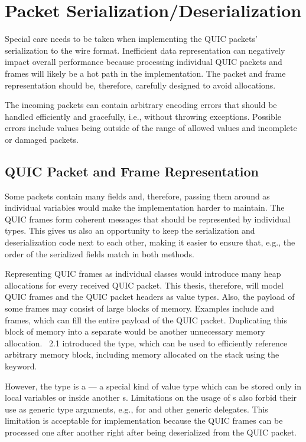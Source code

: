 \section{Packet Serialization/Deserialization}

Special care needs to be taken when implementing the QUIC packets' serialization to the wire format.
Inefficient data representation can negatively impact overall performance because processing
individual QUIC packets and frames will likely be a hot path in the implementation. The packet and
frame representation should be, therefore, carefully designed to avoid allocations.

The incoming packets can contain arbitrary encoding errors that should be handled efficiently and
gracefully, i.e., without throwing exceptions. Possible errors include values being outside of the
range of allowed values and incomplete or damaged packets.

\subsection{QUIC Packet and Frame Representation}\label{sec:03-data-representation}

Some packets contain many fields and, therefore, passing them around as individual variables would
make the implementation harder to maintain. The QUIC frames form coherent messages that should be
represented by individual \dotnet{} types. This gives us also an opportunity to keep the
serialization and deserialization code next to each other, making it easier to ensure that, e.g.,
the order of the serialized fields match in both methods.

Representing QUIC frames as individual classes would introduce many heap allocations for every
received QUIC packet. This thesis, therefore, will model QUIC frames and the QUIC packet headers as
value types. Also, the payload of some frames may consist of large blocks of memory. Examples
include \STREAM{} and \CRYPTO{} frames, which can fill the entire payload of the QUIC packet.
Duplicating this block of memory into a separate \ArrayOf{\Byte{}} would be another unnecessary memory
allocation. \dotnet{}~2.1 introduced the  type, which can be used to efficiently
reference arbitrary memory block, including memory allocated on the stack using the
 keyword.

However, the  type is a  --- a special kind of value type which
can be stored only in local variables or inside another s. Limitations on the
usage of s also forbid their use as generic type arguments, e.g., for
\FuncOf{} and other generic delegates. This limitation is acceptable for \QuicConnection{}
implementation because the QUIC frames can be processed one after another right after being
deserialized from the QUIC packet.

